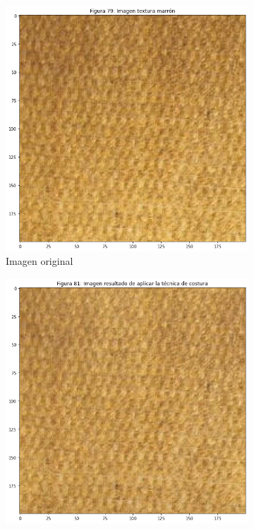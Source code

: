 \documentclass[11pt,twoside,titlepage,a4paper]{article}
\numberwithin{equation}{section} %
\theoremstyle{usual}
\begin{document}
\begin{figure}[h]
    \centering
    \begin{subfigure}[t]{.3\textwidth}
        \centering
        \includegraphics[width=\textwidth]{imagenes/PoissonImageEditing_cell_89_output_0.png}
        \caption{Imagen original}
        \label{fig:costuraImgOriginal}
    \end{subfigure}
    \centering
    \begin{subfigure}[t]{.3\textwidth}
        \centering
        \includegraphics[width=\textwidth]{imagenes/PoissonImageEditing_cell_89_output_2.png}

\end{subfigure}
\end{figure}
\end{document}
